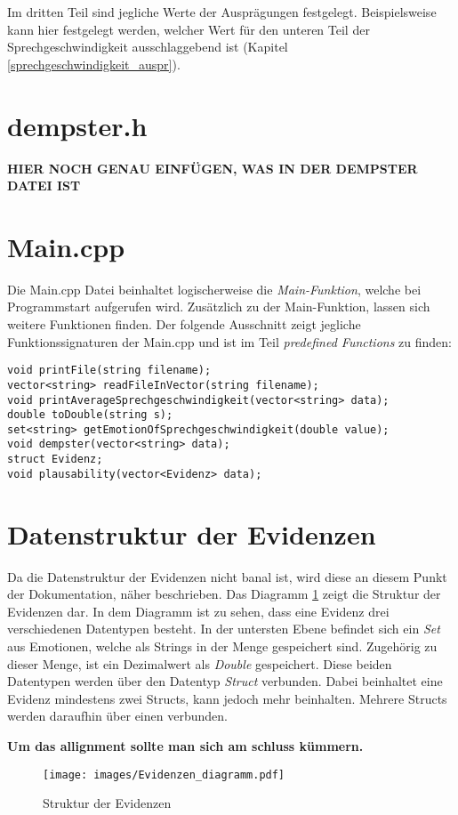 Im dritten Teil sind jegliche Werte der Ausprägungen festgelegt. Beispielsweise kann hier festgelegt werden, welcher Wert für den unteren Teil der Sprechgeschwindigkeit ausschlaggebend ist (Kapitel \ref{sprechgeschwindigkeit_auspr}).

\section{dempster.h}
\textbf{HIER NOCH GENAU EINFÜGEN, WAS IN DER DEMPSTER DATEI IST}

\section{Main.cpp}
Die Main.cpp Datei beinhaltet logischerweise die \textit{Main-Funktion}, welche bei Programmstart aufgerufen wird.
Zusätzlich zu der Main-Funktion, lassen sich weitere Funktionen finden. Der folgende Ausschnitt zeigt jegliche Funktionssignaturen der Main.cpp und ist im Teil \textit{predefined Functions} zu finden: 

\begin{lstlisting}[caption=Predefined classes/functions aus der Main.cpp, label=Bsp.1]
void printFile(string filename);
vector<string> readFileInVector(string filename);
void printAverageSprechgeschwindigkeit(vector<string> data); 
double toDouble(string s); 
set<string> getEmotionOfSprechgeschwindigkeit(double value); 
void dempster(vector<string> data);
struct Evidenz;
void plausability(vector<Evidenz> data);
\end{lstlisting}

\section{Datenstruktur der Evidenzen}
Da die Datenstruktur der Evidenzen nicht banal ist, wird diese an diesem Punkt der Dokumentation, näher beschrieben. Das Diagramm \ref{diagramm_evidenzen} zeigt die Struktur der Evidenzen dar. In dem Diagramm ist zu sehen, dass eine Evidenz drei verschiedenen Datentypen besteht. In der untersten Ebene befindet sich ein \textit{Set} aus Emotionen, welche als Strings in der Menge gespeichert sind. Zugehörig zu dieser Menge, ist ein Dezimalwert als \textit{Double} gespeichert. Diese beiden Datentypen werden über den Datentyp \textit{Struct} verbunden. Dabei beinhaltet eine Evidenz mindestens zwei Structs, kann jedoch mehr beinhalten. Mehrere Structs werden daraufhin über einen  verbunden.

\textbf{Um das allignment sollte man sich am schluss kümmern.}
\begin{figure}
\centering
\texttt{[image: images/Evidenzen\_diagramm.pdf]}
\caption{Struktur der Evidenzen}
\label{diagramm_evidenzen}
\end{figure}

